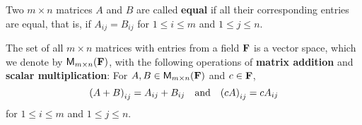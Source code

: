 \begin{defn}\label{1.2.8}
    Two \(m \times n\) matrices \(A\) and \(B\) are called \textbf{equal} if all their corresponding entries are equal, that is, if \(A_{i j} = B_{i j}\) for \(1 \leq i \leq m\) and \(1 \leq j \leq n\).
\end{defn}

\begin{eg}\label{1.2.9}
    The set of all \(m \times n\) matrices with entries from a field \(\mathbf{F}\) is a vector space, which we denote by \({\mathsf{M}_{{m} \times n}({\mathbf{F}})}\), with the following operations of \textbf{matrix addition} and \textbf{scalar multiplication}:
    For \(A, B \in {\mathsf{M}_{{m} \times n}({\mathbf{F}})}\) and \(c \in \mathbf{F}\),
    \[
        \p{A + B}_{i j} = A_{i j} + B_{i j} \quad \text{and} \quad \p{c A}_{i j} = c A_{i j}
    \]
    for \(1 \leq i \leq m\) and \(1 \leq j \leq n\).
\end{eg}

